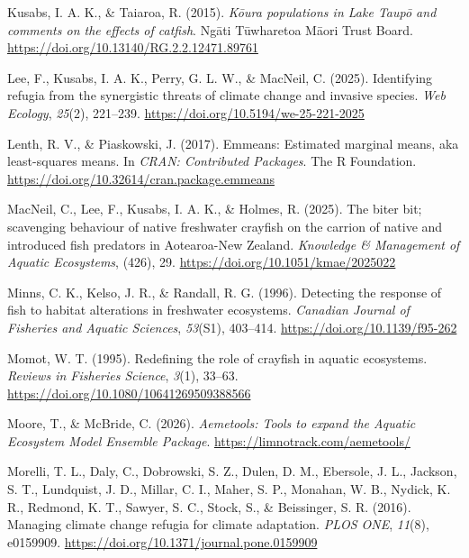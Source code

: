 \documentclass[
  letterpaper,
  DIV=11,
  numbers=noendperiod]{scrartcl}
\newlength{\cslhangindent}
\newenvironment{CSLReferences}[2] %
 {\begin{list}{}{%
  \setlength{\itemindent}{0pt}
  \setlength{\leftmargin}{0pt}
  \setlength{\parsep}{0pt}
  \ifodd #1
   \setlength{\leftmargin}{\cslhangindent}
   \setlength{\itemindent}{-1\cslhangindent}
  \fi
  \setlength{\itemsep}{#2\baselineskip}}}
 {\end{list}}
\begin{document}
\begin{CSLReferences}{1}{0}
Kusabs, I. A. K., \& Taiaroa, R. (2015). \emph{K{ō}ura populations in
{Lake Taup{ō}} and comments on the effects of catfish}. Ngāti Tūwharetoa
Māori Trust Board. \url{https://doi.org/10.13140/RG.2.2.12471.89761}

Lee, F., Kusabs, I. A. K., Perry, G. L. W., \& MacNeil, C. (2025).
Identifying refugia from the synergistic threats of climate change and
invasive species. \emph{Web Ecology}, \emph{25}(2), 221--239.
\url{https://doi.org/10.5194/we-25-221-2025}

Lenth, R. V., \& Piaskowski, J. (2017). Emmeans: Estimated marginal
means, aka least-squares means. In \emph{CRAN: Contributed Packages}.
The R Foundation. \url{https://doi.org/10.32614/cran.package.emmeans}

MacNeil, C., Lee, F., Kusabs, I. A. K., \& Holmes, R. (2025). The biter
bit; scavenging behaviour of native freshwater crayfish on the carrion
of native and introduced fish predators in {Aotearoa-New Zealand}.
\emph{Knowledge \& Management of Aquatic Ecosystems}, (426), 29.
\url{https://doi.org/10.1051/kmae/2025022}

Minns, C. K., Kelso, J. R., \& Randall, R. G. (1996). Detecting the
response of fish to habitat alterations in freshwater ecosystems.
\emph{Canadian Journal of Fisheries and Aquatic Sciences},
\emph{53}(S1), 403--414. \url{https://doi.org/10.1139/f95-262}

Momot, W. T. (1995). Redefining the role of crayfish in aquatic
ecosystems. \emph{Reviews in Fisheries Science}, \emph{3}(1), 33--63.
\url{https://doi.org/10.1080/10641269509388566}

Moore, T., \& McBride, C. (2026). \emph{Aemetools: {Tools} to expand the
{Aquatic Ecosystem Model Ensemble Package}}.
\url{https://limnotrack.com/aemetools/}

Morelli, T. L., Daly, C., Dobrowski, S. Z., Dulen, D. M., Ebersole, J.
L., Jackson, S. T., Lundquist, J. D., Millar, C. I., Maher, S. P.,
Monahan, W. B., Nydick, K. R., Redmond, K. T., Sawyer, S. C., Stock, S.,
\& Beissinger, S. R. (2016). Managing climate change refugia for climate
adaptation. \emph{PLOS ONE}, \emph{11}(8), e0159909.
\url{https://doi.org/10.1371/journal.pone.0159909}


\end{CSLReferences}
\end{document}
